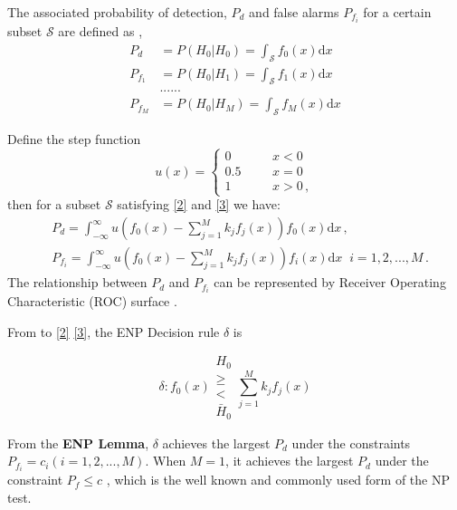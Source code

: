 The associated probability of detection, $P_d$ and false alarms $P_{f_i}$ for a certain subset $\mathcal{S}$ are defined as
\cite{neyman1933problem}, 
\begin{equation}
\begin{split}
P_d &= P(H_0 | H_0) = \int_{\mathcal{S}}f_0(x)\mathrm{d}x\\
P_{f_1} &= P(H_0 | H_1) = \int_{\mathcal{S}}f_1(x)\mathrm{d}x\\
&......\\
P_{f_M} &= P(H_0 | H_M) = \int_{\mathcal{S}}f_M(x)\mathrm{d}x
\label{equ:2015may9a0}
\end{split}
\end{equation}

 Define the step function
\begin{equation}
   \label{equ: step function}
   u(x) = \begin{cases}
     0\;\;\;\;\;\;&x < 0\\
     0.5\;\;\;\;\;\;&x=0\\
     1\;\;\;\;\;\;&x>0\,,
   \end{cases}
\end{equation}
then for a subset $\mathcal{S}$ satisfying \eqref{2} and \eqref{3} we have:
\begin{equation}
\label{equ: pf and pd}
\begin{split}
&P_d = \int_{-\infty}^{\infty} u(f_0(x) - \sum_{j=1}^{M}k_jf_j(x)) f_0(x)\mathrm{d}x	\,, \\
&P_{f_i} = \int_{-\infty}^{\infty} u(f_0(x) - \sum_{j=1}^{M}k_jf_j(x)) f_i(x) \mathrm{d}x\;\;	 i=1, 2, ..., M\,.
\end{split}
\end{equation}
The relationship between $P_d$ and $P_{f_i}$ can be represented by Receiver Operating Characteristic (ROC) surface \cite{LehmannTest}.

From to \eqref{2} \eqref{3}, the ENP Decision rule $\delta$ is

\begin{equation}
\label{equ: decision rule}
\delta: f_0(x) \substack{H_0 \\ \geq \\ < \\ \bar{H}_0}  \sum_{j=1}^{M} k_jf_j(x)
\end{equation}

From the  \textbf{ENP Lemma}, $\delta$  achieves the largest $P_d$ under the constraints $P_{f_i} = c_i (i = 1, 2, ..., M)$.
When $M=1$, it achieves the largest $P_d$ under the constraint $P_f \leq c$ \cite{LehmannTest}, which is the well known and commonly used form of the NP test.


